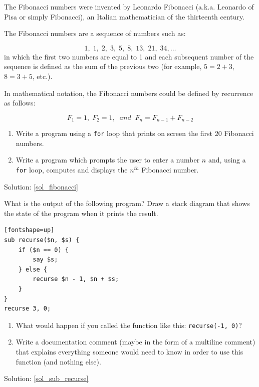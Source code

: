 \begin{exercise} 
\label{fibonacci}
The Fibonacci numbers were invented by Leonardo Fibonacci 
(a.k.a. Leonardo of Pisa or simply Fibonacci), an Italian 
mathematician of the thirteenth century.

The Fibonacci numbers are a sequence of numbers such as:

\[1, \;1, \;2, \;3, \;5, \;8, \;13, \;21, \;34, \ldots\]
%
in which the first two numbers are equal to 1 and each 
subsequent number of the sequence is defined as the sum of 
the previous two (for example, $5 = 2 + 3$, $8 = 3 + 5$, etc.).

In mathematical notation, the Fibonacci numbers could be defined by recurrence as follows:

\[F_1 = 1, \;F_2 = 1, \;\;and\;\;  F_n = F_{n-1} + F_{n-2} \]
%
\begin{enumerate}

\item Write a program using a {\tt for} loop that prints on screen the first 20 Fibonacci numbers.

\item Write a program which prompts the user to enter a number 
$n$ and, using a {\tt for} loop, computes and displays the 
$n^{th}$ Fibonacci number.

\end{enumerate}

Solution: \ref{sol_fibonacci}


\end{exercise}

\begin{exercise}
\label{sub_recurse}

What is the output of the following program?
Draw a stack diagram that shows the state of the program
when it prints the result.

\begin{verbatim}[fontshape=up]
sub recurse($n, $s) {
    if ($n == 0) {
        say $s;
    } else {
        recurse $n - 1, $n + $s;
    }
}
recurse 3, 0;
\end{verbatim}

\begin{enumerate}

\item What would happen if you called the function like 
this: {\tt recurse(-1, 0)}?

\item Write a documentation comment (maybe in the form of a multiline comment) that explains everything someone would need to know in order to use this function (and nothing else).

\end{enumerate}

Solution: \ref{sol_sub_recurse}

\end{exercise}



